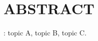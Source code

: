  \label{abstract}
\chapter*{ABSTRACT}

{\linespread{1.35}\selectfont{}

\kant[1-2]  %

}

\vfill
{}:  topic A, topic B, topic C.
